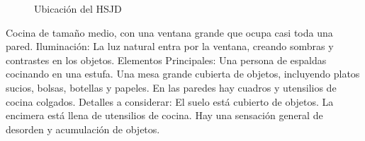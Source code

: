 \begin{figure}[h]
\caption{Ubicación del HSJD}
\label{fig:ubicacion_hsjd}
\end{figure}


Cocina de tamaño medio, con una ventana grande que ocupa casi toda una pared. Iluminación: La luz natural entra por la ventana, creando sombras y contrastes en los objetos. Elementos Principales: Una persona de espaldas cocinando en una estufa. Una mesa grande cubierta de objetos, incluyendo platos sucios, bolsas, botellas y papeles. En las paredes hay cuadros y utensilios de cocina colgados. Detalles a considerar: El suelo está cubierto de objetos. La encimera está llena de utensilios de cocina. Hay una sensación general de desorden y acumulación de objetos. \parencite[fotograma: 00:34:25]{video_diaz2016}